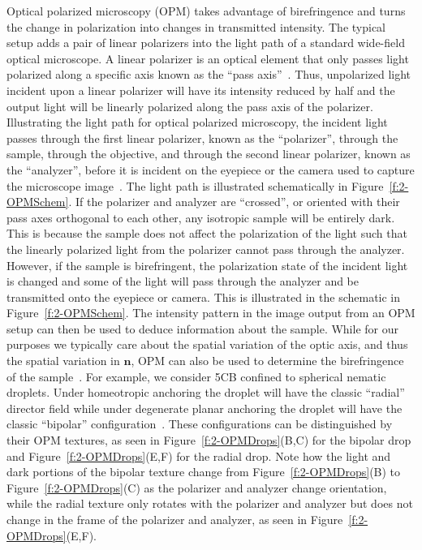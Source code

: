 Optical polarized microscopy (OPM) takes advantage of birefringence and turns the change in polarization into changes in transmitted intensity.
The typical setup adds a pair of linear polarizers into the light path of a standard wide-field optical microscope.
A linear polarizer is an optical element that only passes light polarized along a specific axis known as the ``pass axis''~\cite{RN232}.
Thus, unpolarized light incident upon a linear polarizer will have its intensity reduced by half and the output light will be linearly polarized along the pass axis of the polarizer.
Illustrating the light path for optical polarized microscopy, the incident light passes through the first linear polarizer, known as the ``polarizer'', through the sample, through the objective, and through the second linear polarizer, known as the ``analyzer'', before it is incident on the eyepiece or the camera used to capture the microscope image~\cite{RN232}.
The light path is illustrated schematically in Figure~\ref{f:2-OPMSchem}.
If the polarizer and analyzer are ``crossed'', or oriented with their pass axes orthogonal to each other, any isotropic sample will be entirely dark.
This is because the sample does not affect the polarization of the light such that the linearly polarized light from the polarizer cannot pass through the analyzer.
However, if the sample is birefringent, the polarization state of the incident light is changed and some of the light will pass through the analyzer and be transmitted onto the eyepiece or camera.
This is illustrated in the schematic in Figure~\ref{f:2-OPMSchem}.
The intensity pattern in the image output from an OPM setup can then be used to deduce information about the sample.
While for our purposes we typically care about the spatial variation of the optic axis, and thus the spatial variation in $\mathbf{n}$, OPM can also be used to determine the birefringence of the sample~\cite{RN232}.
For example, we consider 5CB confined to spherical nematic droplets.
Under homeotropic anchoring the droplet will have the classic ``radial'' director field while under degenerate planar anchoring the droplet will have the classic ``bipolar'' configuration~\cite{RN177}.
These configurations can be distinguished by their OPM textures, as seen in Figure~\ref{f:2-OPMDrops}(B,C) for the bipolar drop and Figure~\ref{f:2-OPMDrops}(E,F) for the radial drop.
Note how the light and dark portions of the bipolar texture change from Figure~\ref{f:2-OPMDrops}(B) to Figure~\ref{f:2-OPMDrops}(C) as the polarizer and analyzer change orientation, while the radial texture only rotates with the polarizer and analyzer but does not change in the frame of the polarizer and analyzer, as seen in Figure~\ref{f:2-OPMDrops}(E,F).
